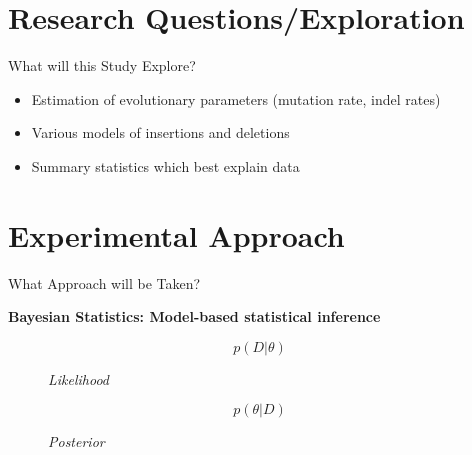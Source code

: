 \documentclass{beamer}
\begin{document}
	\section{Research Questions/Exploration}
	
	\begin{frame}{What will this Study Explore?}
		\begin{itemize}
			\item Estimation of evolutionary parameters (mutation rate, indel rates) \newline
			\item Various models of insertions and deletions \newline
			\item Summary statistics which best explain data
		\end{itemize}
		
	\end{frame}

	\section{Experimental Approach}
	\begin{frame}{What Approach will be Taken?}
	
	\textbf{Bayesian Statistics: Model-based statistical inference}
	
	\begin{figure}
		
		\begin{equation} \tag{1}
			p(D|\theta)
		\end{equation}
	\caption{\textit{Likelihood}} \pause
	
		\begin{equation} \tag{2}
			p(\theta|D)
		\end{equation}
	\caption{\textit{Posterior}}
	
	\end{figure}
	
	\end{frame}
\end{document}
